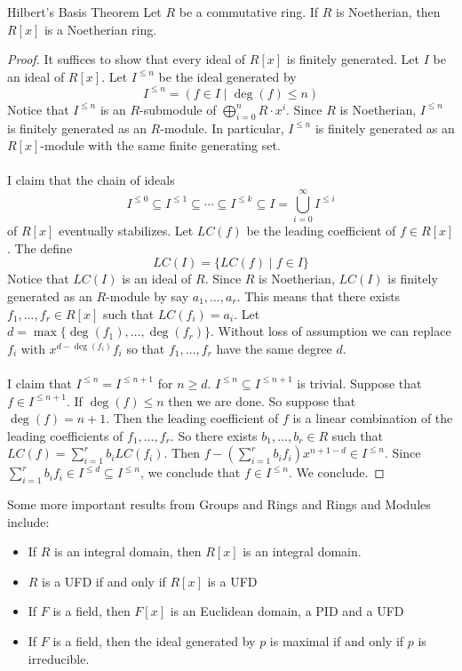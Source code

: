\documentclass[a4paper]{article}
\begin{document}
\begin{thm}{Hilbert's Basis Theorem}{} Let $R$ be a commutative ring. If $R$ is Noetherian, then $R[x]$ is a Noetherian ring. 
\begin{proof}
It suffices to show that every ideal of $R[x]$ is finitely generated. Let $I$ be an ideal of $R[x]$. Let $I^{\leq n}$ be the ideal generated by $$I^{\leq n}=(f\in I\;|\;\deg(f)\leq n)$$ Notice that $I^{\leq n}$ is an $R$-submodule of $\bigoplus_{i=0}^nR\cdot x^i$. Since $R$ is Noetherian, $I^{\leq n}$ is finitely generated as an $R$-module. In particular, $I^{\leq n}$ is finitely generated as an $R[x]$-module with the same finite generating set. \\~\\

I claim that the chain of ideals $$I^{\leq 0}\subseteq I^{\leq 1}\subseteq\cdots\subseteq I^{\leq k}\subseteq I=\bigcup_{i=0}^\infty I^{\leq i}$$ of $R[x]$ eventually stabilizes. Let $LC(f)$ be the leading coefficient of $f\in R[x]$. The define $$LC(I)=\{LC(f)\;|\;f\in I\}$$ Notice that $LC(I)$ is an ideal of $R$. Since $R$ is Noetherian, $LC(I)$ is finitely generated as an $R$-module by say $a_1,\dots,a_r$. This means that there exists $f_1,\dots,f_r\in R[x]$ such that $LC(f_i)=a_i$. Let $d=\max\{\deg(f_1),\dots,\deg(f_r)\}$. Without loss of assumption we can replace $f_i$ with $x^{d-\deg(f_i)}f_i$ so that $f_1,\dots,f_r$ have the same degree $d$. \\~\\

I claim that $I^{\leq n}=I^{\leq n+1}$ for $n\geq d$. $I^{\leq n}\subseteq I^{\leq n+1}$ is trivial. Suppose that $f\in I^{\leq n+1}$. If $\deg(f)\leq n$ then we are done. So suppose that $\deg(f)=n+1$. Then the leading coefficient of $f$ is a linear combination of the leading coefficients of $f_1,\dots,f_r$. So there exists $b_1,\dots,b_r\in R$ such that $LC(f)=\sum_{i=1}^rb_iLC(f_i)$. Then $f-\left(\sum_{i=1}^rb_if_i\right)x^{n+1-d}\in I^{\leq n}$. Since $\sum_{i=1}^rb_if_i\in I^{\leq d}\subseteq I^{\leq n}$, we conclude that $f\in I^{\leq n}$. We conclude. 
\end{proof}
\end{thm}

Some more important results from Groups and Rings and Rings and Modules include: 
\begin{itemize}
\item If $R$ is an integral domain, then $R[x]$ is an integral domain. 
\item $R$ is a UFD if and only if $R[x]$ is a UFD
\item If $F$ is a field, then $F[x]$ is an Euclidean domain, a PID and a UFD
\item If $F$ is a field, then the ideal generated by $p$ is maximal if and only if $p$ is irreducible. 
\end{itemize}
\end{document}
